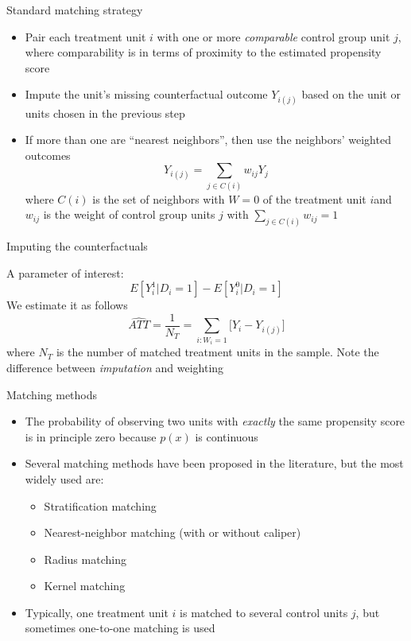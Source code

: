 \documentclass{beamer}
\begin{document}
\begin{frame}{Standard matching strategy}
	
	\begin{itemize}
	\item Pair each treatment unit $i$ with one or more \emph{comparable} control group unit $j$, where comparability is in terms of proximity to the estimated propensity score
	\item Impute the unit's missing counterfactual outcome $Y_{i(j)}$ based on the unit or units chosen in the previous step
	\item If more than one are ``nearest neighbors'', then use the neighbors' weighted outcomes  $$Y_{i(j)} = \sum_{j \in C(i)} w_{ij}Y_j$$ where $C(i)$ is the set of neighbors with $W=0$ of the treatment unit $i$and $w_{ij}$ is the weight of control group units $j$ with $\sum_{j \in C(i)} w_{ij} = 1$
	\end{itemize}
\end{frame}


\begin{frame}{Imputing the counterfactuals}
	
	A parameter of interest: $$E[Y^1_i | D_i=1] - E[Y^0_i | D_i=1]$$We estimate it as follows  $$\widehat{ATT} = \frac{1}{N_T} = \sum_{i:W_i=1} \bigg [Y_i - Y_{i(j)} \bigg ]$$where $N_T$ is the number of matched treatment units in the sample. Note the difference between \emph{imputation} and weighting

\end{frame}

\begin{frame}{Matching methods}
	
	\begin{itemize}
	\item The probability of observing two units with \emph{exactly} the same propensity score is in principle zero because $p(x)$ is continuous
	\item Several matching methods have been proposed in the literature, but the most widely used are:
		\begin{itemize}
		\item Stratification matching
		\item Nearest-neighbor matching (with or without caliper)
		\item Radius matching
		\item Kernel matching
		\end{itemize}
	\item Typically, one treatment unit $i$ is matched to several control units $j$, but sometimes one-to-one matching is used
	\end{itemize}
	
\end{frame}
\end{document}
